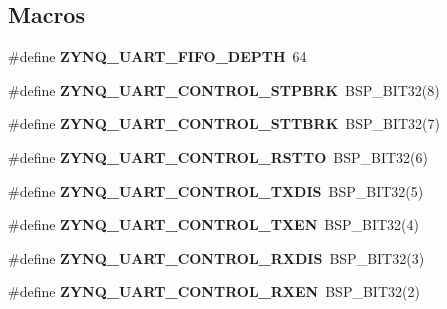 \subsection*{Macros}
\begin{DoxyCompactItemize}
\item 
\#define {\bfseries Z\+Y\+N\+Q\+\_\+\+U\+A\+R\+T\+\_\+\+F\+I\+F\+O\+\_\+\+D\+E\+P\+TH}~64
\item 
\mbox{\label{zynq-uart-regs_8h_ac041a9381e84c13033117cced6a30693}} 
\#define {\bfseries Z\+Y\+N\+Q\+\_\+\+U\+A\+R\+T\+\_\+\+C\+O\+N\+T\+R\+O\+L\+\_\+\+S\+T\+P\+B\+RK}~B\+S\+P\+\_\+\+B\+I\+T32(8)
\item 
\mbox{\label{zynq-uart-regs_8h_a6a2e377c4ddccd0c8d11be33f54e95bd}} 
\#define {\bfseries Z\+Y\+N\+Q\+\_\+\+U\+A\+R\+T\+\_\+\+C\+O\+N\+T\+R\+O\+L\+\_\+\+S\+T\+T\+B\+RK}~B\+S\+P\+\_\+\+B\+I\+T32(7)
\item 
\mbox{\label{zynq-uart-regs_8h_aeb0e720113cab6e26702aee26603402c}} 
\#define {\bfseries Z\+Y\+N\+Q\+\_\+\+U\+A\+R\+T\+\_\+\+C\+O\+N\+T\+R\+O\+L\+\_\+\+R\+S\+T\+TO}~B\+S\+P\+\_\+\+B\+I\+T32(6)
\item 
\mbox{\label{zynq-uart-regs_8h_a4f57af5bb68211700d74928a9adcd3b1}} 
\#define {\bfseries Z\+Y\+N\+Q\+\_\+\+U\+A\+R\+T\+\_\+\+C\+O\+N\+T\+R\+O\+L\+\_\+\+T\+X\+D\+IS}~B\+S\+P\+\_\+\+B\+I\+T32(5)
\item 
\mbox{\label{zynq-uart-regs_8h_ade28b3cf909ef66432b083085c4863b3}} 
\#define {\bfseries Z\+Y\+N\+Q\+\_\+\+U\+A\+R\+T\+\_\+\+C\+O\+N\+T\+R\+O\+L\+\_\+\+T\+X\+EN}~B\+S\+P\+\_\+\+B\+I\+T32(4)
\item 
\mbox{\label{zynq-uart-regs_8h_a416faff556996cd6a9afcc755bd0a559}} 
\#define {\bfseries Z\+Y\+N\+Q\+\_\+\+U\+A\+R\+T\+\_\+\+C\+O\+N\+T\+R\+O\+L\+\_\+\+R\+X\+D\+IS}~B\+S\+P\+\_\+\+B\+I\+T32(3)
\item 
\mbox{\label{zynq-uart-regs_8h_ae26e176b69ed0e233ccd4015a104b133}} 
\#define {\bfseries Z\+Y\+N\+Q\+\_\+\+U\+A\+R\+T\+\_\+\+C\+O\+N\+T\+R\+O\+L\+\_\+\+R\+X\+EN}~B\+S\+P\+\_\+\+B\+I\+T32(2)
\item 
\mbox{\label{zynq-uart-regs_8h_a7d5e1cb9c42ea2f819d31477733af4c2}} 

\end{DoxyCompactItemize}
